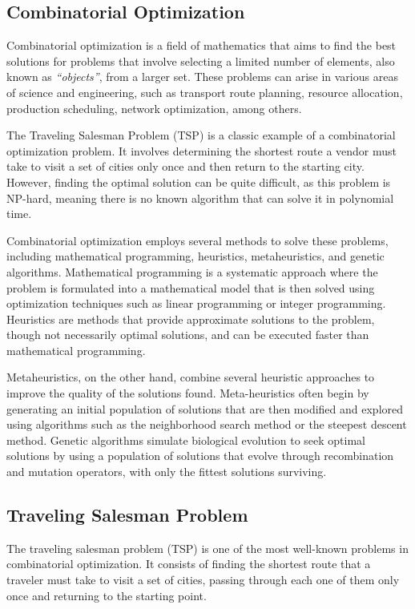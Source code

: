 \documentclass[conference]{IEEEtran}
\begin{document}
\subsection{Combinatorial Optimization}
Combinatorial optimization is a field of mathematics that aims to find the best solutions for problems that involve selecting a limited number of elements, also known as \textit{``objects''}, from a larger set. These problems can arise in various areas of science and engineering, such as transport route planning, resource allocation, production scheduling, network optimization, among others.

The Traveling Salesman Problem (TSP) is a classic example of a combinatorial optimization problem. It involves determining the shortest route a vendor must take to visit a set of cities only once and then return to the starting city. However, finding the optimal solution can be quite difficult, as this problem is NP-hard, meaning there is no known algorithm that can solve it in polynomial time.

Combinatorial optimization employs several methods to solve these problems, including mathematical programming, heuristics, metaheuristics, and genetic algorithms. Mathematical programming is a systematic approach where the problem is formulated into a mathematical model that is then solved using optimization techniques such as linear programming or integer programming. Heuristics are methods that provide approximate solutions to the problem, though not necessarily optimal solutions, and can be executed faster than mathematical programming.

Metaheuristics, on the other hand, combine several heuristic approaches to improve the quality of the solutions found. Meta-heuristics often begin by generating an initial population of solutions that are then modified and explored using algorithms such as the neighborhood search method or the steepest descent method. Genetic algorithms simulate biological evolution to seek optimal solutions by using a population of solutions that evolve through recombination and mutation operators, with only the fittest solutions surviving.

\subsection{Traveling Salesman Problem}

The traveling salesman problem (TSP) is one of the most well-known problems in combinatorial optimization. It consists of finding the shortest route that a traveler must take to visit a set of cities, passing through each one of them only once and returning to the starting point.
\end{document}
